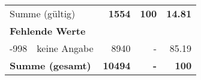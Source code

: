 \begin{longtable}{lXrrr}
     \midrule
     \multicolumn{2}{l}{Summe (gültig)} &
       \textbf{\num{1554}} &
     \textbf{100} &
       \textbf{\num[round-mode=places,round-precision=2]{14,81}} \\
     \multicolumn{5}{l}{\textbf{Fehlende Werte}}\\
       -998 &
       keine Angabe &
         \num{8940} &
        - &
         \num[round-mode=places,round-precision=2]{85,19} \\
     \midrule
     \multicolumn{2}{l}{\textbf{Summe (gesamt)}} &
          \textbf{\num{10494}} &
        \textbf{-} &
        \textbf{100} \\
     \bottomrule
     \end{longtable}
     
